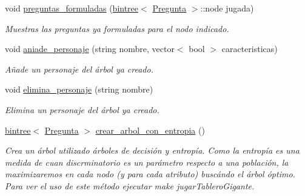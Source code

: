\begin{DoxyCompactItemize}
void \hyperlink{classQuienEsQuien_adcb666b01429a92009d1991bb07379e1}{preguntas\+\_\+formuladas} (\hyperlink{classbintree}{bintree}$<$ \hyperlink{classPregunta}{Pregunta} $>$\+::node jugada)
\begin{DoxyCompactList}\small\item\em Muestras las preguntas ya formuladas para el nodo indicado. \end{DoxyCompactList}\item 
void \hyperlink{classQuienEsQuien_ab2ded22e1d06ccb7c608ea1d7e3061d7}{aniade\+\_\+personaje} (string nombre, vector$<$ bool $>$ caracteristicas)
\begin{DoxyCompactList}\small\item\em Añade un personaje del árbol ya creado. \end{DoxyCompactList}\item 
void \hyperlink{classQuienEsQuien_ada5ff48eb2a12ddd07f11a01d2324982}{elimina\+\_\+personaje} (string nombre)
\begin{DoxyCompactList}\small\item\em Elimina un personaje del árbol ya creado. \end{DoxyCompactList}\item 
\hyperlink{classbintree}{bintree}$<$ \hyperlink{classPregunta}{Pregunta} $>$ \hyperlink{classQuienEsQuien_a5d790b3447a20d6b01c70006c758c41a}{crear\+\_\+arbol\+\_\+con\+\_\+entropia} ()\hypertarget{classQuienEsQuien_a5d790b3447a20d6b01c70006c758c41a}{}\label{classQuienEsQuien_a5d790b3447a20d6b01c70006c758c41a}

\begin{DoxyCompactList}\small\item\em Crea un árbol utilizado árboles de decisión y entropía. Como la entropía es una medida de cuan discrminatorio es un parámetro respecto a una población, la maximizaremos en cada nodo (y para cada atributo) buscándo el árbol óptimo. Para ver el uso de este método ejecutar make jugar\+Tablero\+Gigante. \end{DoxyCompactList}\end{DoxyCompactItemize}
